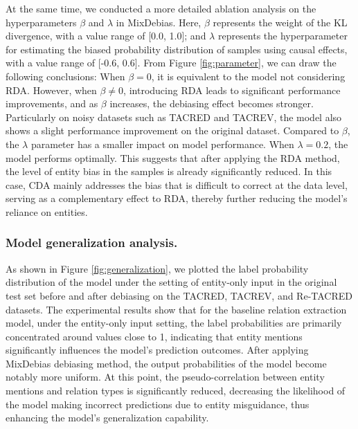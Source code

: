 \documentclass[letterpaper]{article} %
\begin{document}

At the same time, we conducted a more detailed ablation analysis on the hyperparameters \( \beta \) and \( \lambda \) in MixDebias. Here, \( \beta \) represents the weight of the KL divergence, with a value range of [0.0, 1.0]; and \( \lambda \) represents the hyperparameter for estimating the biased probability distribution of samples using causal effects, with a value range of [-0.6, 0.6]. From Figure \ref{fig:parameter}, we can draw the following conclusions: When \( \beta = 0 \), it is equivalent to the model not considering RDA. However, when \(\beta \neq 0\), introducing RDA leads to significant performance improvements, and as \(\beta\) increases, the debiasing effect becomes stronger. Particularly on noisy datasets such as TACRED and TACREV, the model also shows a slight performance improvement on the original dataset. Compared to \(\beta\), the \(\lambda\) parameter has a smaller impact on model performance. When \(\lambda = 0.2\), the model performs optimally. This suggests that after applying the RDA method, the level of entity bias in the samples is already significantly reduced. In this case, CDA mainly addresses the bias that is difficult to correct at the data level, serving as a complementary effect to RDA, thereby further reducing the model's reliance on entities.

\subsubsection{Model generalization analysis.}

As shown in Figure \ref{fig:generalization}, we plotted the label probability distribution of the model under the setting of entity-only input in the original test set before and after debiasing on the TACRED, TACREV, and Re-TACRED datasets. The experimental results show that for the baseline relation extraction model, under the entity-only input setting, the label probabilities are primarily concentrated around values close to 1, indicating that entity mentions significantly influences the model's prediction outcomes. After applying MixDebias debiasing method, the output probabilities of the model become notably more uniform. At this point, the pseudo-correlation between entity mentions and relation types is significantly reduced, decreasing the likelihood of the model making incorrect predictions due to entity misguidance, thus enhancing the model's generalization capability.
\end{document}
